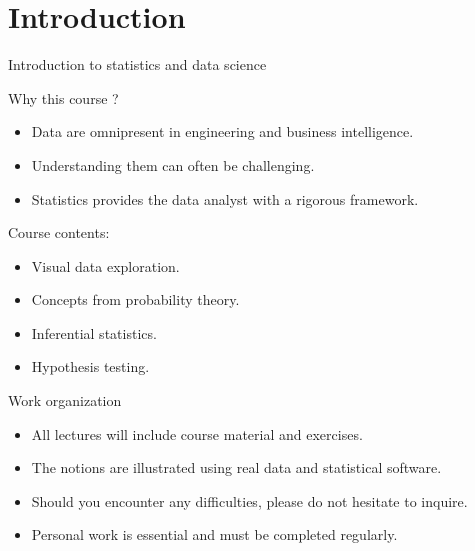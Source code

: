 \section{Introduction}



\begin{frame}[fragile]{Introduction to statistics and data science}
\begin{block}{Why this course ?}
\begin{itemize}
    \item<+-> Data are omnipresent in engineering and business intelligence.
    \item<+-> Understanding them can often be challenging.
    \item<+-> Statistics provides the data analyst with a rigorous framework.
\end{itemize}
\end{block}
\begin{block}{Course contents:}
\begin{itemize}
    \item<+-> Visual data exploration.
    \item<+-> Concepts from probability theory.
    \item<+-> Inferential statistics.
    \item<+-> Hypothesis testing.
\end{itemize}
\end{block}
\end{frame}

\begin{frame}[fragile]{Work organization}
\begin{itemize}
    \item<+-> All lectures will include course material and exercises.
    \item<+-> The notions are illustrated using real data and statistical software.
    \item<+->Should you encounter any difficulties, please do not hesitate to inquire.
    \item<+->Personal work is essential and must be completed regularly.
\end{itemize}
\end{frame}

